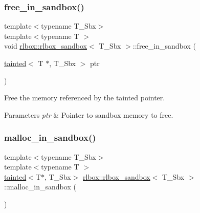 \subsubsection{\texorpdfstring{free\+\_\+in\+\_\+sandbox()}{free\_in\_sandbox()}}
{\footnotesize\ttfamily template$<$typename T\+\_\+\+Sbx$>$ \\
template$<$typename T $>$ \\
void \hyperlink{classrlbox_1_1rlbox__sandbox}{rlbox\+::rlbox\+\_\+sandbox}$<$ T\+\_\+\+Sbx $>$\+::free\+\_\+in\+\_\+sandbox (\begin{DoxyParamCaption}\item[{\hyperlink{classrlbox_1_1tainted}{tainted}$<$ T $\ast$, T\+\_\+\+Sbx $>$}]{ptr }\end{DoxyParamCaption})\hspace{0.3cm}{\ttfamily [inline]}}



Free the memory referenced by the tainted pointer. 


\begin{DoxyParams}{Parameters}
{\em ptr} & Pointer to sandbox memory to free. \\
\hline
\end{DoxyParams}
\mbox{\label{classrlbox_1_1rlbox__sandbox_ab6ecbc8d0d69a3305912fe92882ef6b9}} 
\subsubsection{\texorpdfstring{malloc\+\_\+in\+\_\+sandbox()}{malloc\_in\_sandbox()}\hspace{0.1cm}{\footnotesize\ttfamily [1/2]}}
{\footnotesize\ttfamily template$<$typename T\+\_\+\+Sbx$>$ \\
template$<$typename T $>$ \\
\hyperlink{classrlbox_1_1tainted}{tainted}$<$T$\ast$, T\+\_\+\+Sbx$>$ \hyperlink{classrlbox_1_1rlbox__sandbox}{rlbox\+::rlbox\+\_\+sandbox}$<$ T\+\_\+\+Sbx $>$\+::malloc\+\_\+in\+\_\+sandbox (\begin{DoxyParamCaption}{ }\end{DoxyParamCaption})\hspace{0.3cm}{\ttfamily [inline]}}



